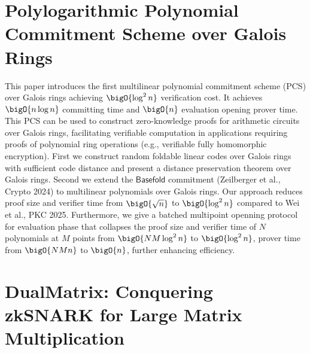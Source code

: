\documentclass[11pt,oneside]{book}
\theoremstyle{definition}
\theoremstyle{remark}
\theoremstyle{plain}
\begin{document}
\section{\cite{cryptoeprint:2025/1767} Polylogarithmic Polynomial Commitment Scheme over Galois Rings
}

This paper introduces the first multilinear polynomial commitment scheme (PCS) over Galois rings achieving $\bigO{\log^2 n}$ verification cost. It achieves $\bigO{n\log n}$ committing time and $\bigO{n}$ evaluation opening prover time. This PCS can be used to construct zero-knowledge proofs for arithmetic circuits over Galois rings, facilitating verifiable computation in applications requiring proofs of polynomial ring operations (e.g., verifiable fully homomorphic encryption). First we construct random foldable linear codes over Galois rings with sufficient code distance and present a distance preservation theorem over Galois rings. Second we extend the $\textsf{Basefold}$ commitment (Zeilberger et al., Crypto 2024) to multilinear polynomials over Galois rings. Our approach reduces proof size and verifier time from $\bigO{\sqrt{n}}$ to $\bigO{\log^2 n}$ compared to Wei et al., PKC 2025. Furthermore, we give a batched multipoint openning protocol for evaluation phase that collapses the proof size and verifier time of $N$ polynomials at $M$ points from $\bigO{NM \log^2 n}$ to $\bigO{\log^2 n}$, prover time from $\bigO{NMn}$ to $\bigO{n}$, further enhancing efficiency.

\section{\cite{cryptoeprint:2025/1768} DualMatrix: Conquering zkSNARK for Large Matrix Multiplication}
\end{document}
